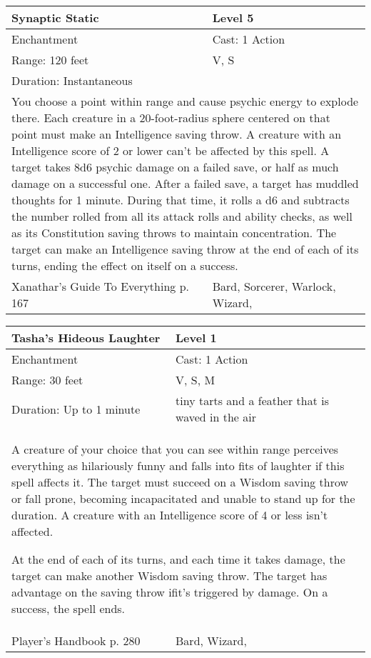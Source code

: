 \documentclass[11pt]{report}
\begin{document}
\begin{table}[H]
	\begin{tabular}{||p{6cm}|p{6cm}||}
		\hline\hline
		\bf{Synaptic Static} & Level 5\\ \hline
		Enchantment & Cast: 1 Action\\ \hline
		Range: 120 feet & V, S\\ \hline
		Duration: Instantaneous & \\ \hline
		\multicolumn{2}{||p{12cm}||}{You choose a point within range and cause psychic energy to explode there. Each creature in a 20-foot-radius sphere centered on that point must make an Intelligence saving throw. A creature with an Intelligence score of 2 or lower can’t be affected by this spell. A target takes 8d6 psychic damage on a failed save, or half as much damage on a successful one.
After a failed save, a target has muddled thoughts for 1 minute. During that time, it rolls a d6 and subtracts the number rolled from all its attack rolls and ability checks, as well as its Constitution saving throws to maintain concentration. The target can make an Intelligence saving throw at the end of each of its turns, ending the effect on itself on a success.}\\ \hline
Xanathar's Guide To Everything p. 167 & Bard, Sorcerer, Warlock, Wizard, \\ \hline\hline
	\end{tabular}
\end{table}

\begin{table}[H]
	\begin{tabular}{||p{6cm}|p{6cm}||}
		\hline\hline
		\bf{Tasha’s Hideous Laughter} & Level 1\\ \hline
		Enchantment & Cast: 1 Action\\ \hline
		Range: 30 feet & V, S, M\\ \hline
		Duration: Up to 1 minute & tiny tarts and a feather that is waved in the air\\ \hline
		\multicolumn{2}{||p{12cm}||}{A creature of your choice that you can see within range perceives everything as hilariously funny and falls into fits of laughter if this spell affects it. The target must succeed on a Wisdom saving throw or fall prone, becoming incapacitated and unable to stand up for the duration. A creature with an Intelligence score of 4 or less isn’t affected.

At the end of each of its turns, and each time it takes damage, the target can make another Wisdom saving throw. The target has advantage on the saving throw ifit’s triggered by damage. On a success, the spell ends.}\\ \hline
Player's Handbook p. 280 & Bard, Wizard, \\ \hline\hline
	\end{tabular}
\end{table}
\end{document}
